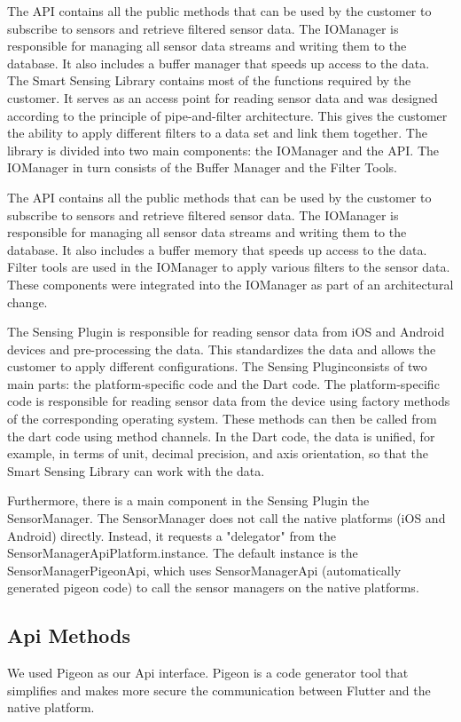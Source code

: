 \documentclass[12pt]{article}
\newcounter{fr}
\begin{document}
The API contains all the public methods that can be used by the customer to subscribe to sensors and retrieve filtered sensor data. The IOManager is responsible for managing all sensor data streams and writing them to the database. It also includes a buffer manager that speeds up access to the data. The Smart Sensing Library contains most of the functions required by the customer. It serves as an access point for reading sensor data and was designed according to the principle of pipe-and-filter architecture. This gives the customer the ability to apply different filters to a data set and link them together. The library is divided into two main components: the IOManager and the API. The IOManager in turn consists of the Buffer Manager and the Filter Tools.

The API contains all the public methods that can be used by the customer to subscribe to sensors and retrieve filtered sensor data. The IOManager is responsible for managing all sensor data streams and writing them to the database. It also includes a buffer memory that speeds up access to the data. Filter tools are used in the IOManager to apply various filters to the sensor data. These components were integrated into the IOManager as part of an architectural change.

The Sensing Plugin is responsible for reading sensor data from iOS and Android devices and pre-processing the data. This standardizes the data and allows the customer to apply different configurations. The Sensing Pluginconsists of two main parts: the platform-specific code and the Dart code. The platform-specific code is responsible for reading sensor data from the device using factory methods of the corresponding operating system. These methods can then be called from the dart code using method channels. In the Dart code, the data is unified, for example, in terms of unit, decimal precision, and axis orientation, so that the Smart Sensing Library can work with the data.

Furthermore, there is a main component in the Sensing Plugin the SensorManager. The SensorManager does not call the native platforms (iOS and Android) directly. Instead, it requests a "delegator" from the SensorManagerApiPlatform.instance. The default instance is the SensorManagerPigeonApi, which uses SensorManagerApi (automatically generated pigeon code) to call the sensor managers on the native platforms.

\subsection{Api Methods}
We used Pigeon as our Api interface. Pigeon is a code generator tool that simplifies and makes more secure the communication between Flutter and the native platform.
\end{document}
